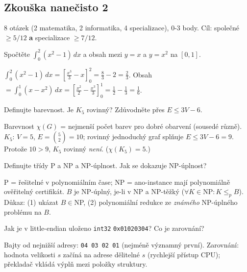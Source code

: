 \subsection*{Zkouška nanečisto 2}
\begin{infobox}[title={Pokyny}]
\footnotesize 8 otázek (2 matematika, 2 informatika, 4 specializace), 0-3 body. Cíl: společné $\ge5/12$ \textbf{a} specializace $\ge7/12$.
\end{infobox}

\begin{zadani}Spočtěte $\int_0^2 (x^2-1)\,dx$ a obsah mezi $y=x$ a $y=x^2$ na $[0,1]$.\end{zadani}
\begin{reseni}$\int_0^2(x^2-1)\,dx=[\tfrac{x^3}{3}-x]_0^2=\tfrac83-2=\tfrac23$. Obsah $=\int_0^1(x-x^2)\,dx=[\tfrac{x^2}{2}-\tfrac{x^3}{3}]_0^1=\tfrac12-\tfrac13=\tfrac16$.\end{reseni}

\begin{zadani}Definujte barevnost. Je $K_5$ rovinný? Zdůvodněte přes $E\le 3V-6$.\end{zadani}
\begin{reseni}Barevnost $\chi(G)$ = nejmenší počet barev pro dobré obarvení (sousedé různě). $K_5$: $V=5$, $E=\binom52=10$; rovinný jednoduchý graf splňuje $E\le3V-6=9$. Protože $10>9$, $K_5$ rovinný \emph{není}. ($\chi(K_5)=5$.)\end{reseni}

\begin{zadani}Definujte třídy P a NP a NP-úplnost. Jak se dokazuje NP-úplnost?\end{zadani}
\begin{reseni}P = řešitelné v polynomiálním čase; NP = ano-instance mají polynomiálně ověřitelný certifikát. $B$ je NP-úplný, je-li v NP a NP-těžký ($\forall K\in$NP$:K\le_p B$). Důkaz: (1) ukázat $B\in$NP, (2) polynomiální redukce ze \emph{známého} NP-úplného problému na $B$.\end{reseni}

\begin{zadani}Jak je v little-endian uloženo \texttt{int32} \texttt{0x01020304}? Co je zarovnání?\end{zadani}
\begin{reseni}Bajty od nejnižší adresy: \texttt{04 03 02 01} (nejméně významný první). Zarovnání: hodnota velikosti $s$ začíná na adrese dělitelné $s$ (rychlejší přístup CPU); překladač vkládá výplň mezi položky struktury.\end{reseni}

